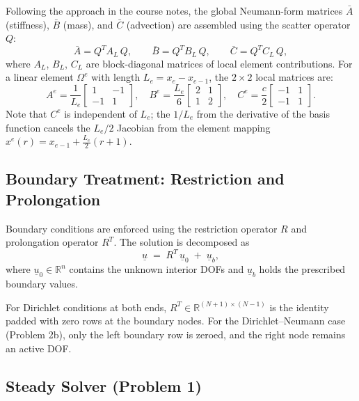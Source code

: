 \documentclass[11pt]{article}
\begin{document}
Following the approach in the course notes, the global Neumann-form matrices
$\bar{A}$ (stiffness), $\bar{B}$ (mass), and $\bar{C}$ (advection) are
assembled using the scatter operator $Q$:
\begin{equation}\label{eq:assembly}
  \bar{A} = Q^T A_L\,Q,
  \qquad
  \bar{B} = Q^T B_L\,Q,
  \qquad
  \bar{C} = Q^T C_L\,Q,
\end{equation}
where $A_L$, $B_L$, $C_L$ are block-diagonal matrices of local element
contributions.  For a linear element $\Omega^e$ with length $L_e = x_{e} - x_{e-1}$,
the $2\times2$ local matrices are:
\begin{equation}\label{eq:local}
  A^e = \frac{1}{L_e}\begin{bmatrix}1&-1\\-1&1\end{bmatrix},
  \quad
  B^e = \frac{L_e}{6}\begin{bmatrix}2&1\\1&2\end{bmatrix},
  \quad
  C^e = \frac{c}{2}\begin{bmatrix}-1&1\\-1&1\end{bmatrix}.
\end{equation}
Note that $C^e$ is independent of $L_e$; the $1/L_e$ from the derivative of the
basis function cancels the $L_e/2$ Jacobian from the element mapping
$x^e(r) = x_{e-1} + \tfrac{L_e}{2}(r+1)$.

\subsection{Boundary Treatment: Restriction and Prolongation}

Boundary conditions are enforced using the restriction operator $R$ and
prolongation operator $R^T$.  The solution is decomposed as
\begin{equation}\label{eq:decomp}
  \underline{u} \;=\; R^T\,\underline{u}_0 \;+\; \underline{u}_b,
\end{equation}
where $\underline{u}_0 \in \mathbb{R}^n$ contains the unknown interior DOFs and
$\underline{u}_b$ holds the prescribed boundary values.

For Dirichlet conditions at both ends, $R^T\in\mathbb{R}^{(N+1)\times(N-1)}$
is the identity padded with zero rows at the boundary nodes.
For the Dirichlet--Neumann case (Problem 2b), only the left boundary
row is zeroed, and the right node remains an active DOF.

\subsection{Steady Solver (Problem 1)}
\end{document}
